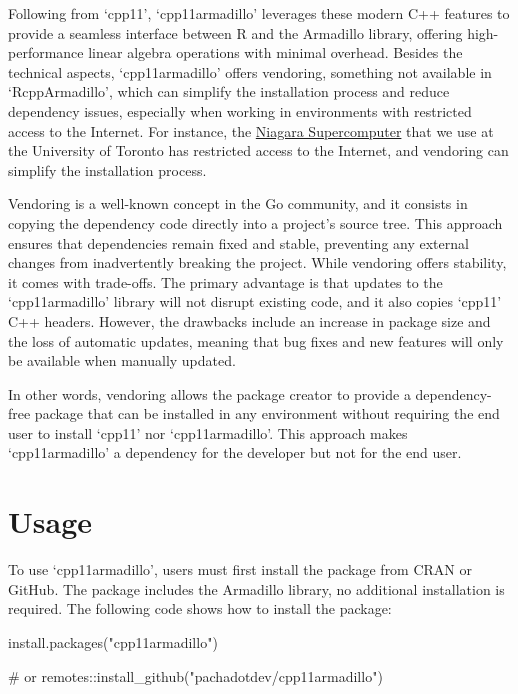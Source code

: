 \documentclass[
  10pt,
  letterpaper,
]{article}
\newenvironment{Shaded}{\begin{snugshade}}{\end{snugshade}}
\newcommand{\CommentTok}[1]{\textcolor[rgb]{0.37,0.37,0.37}{#1}}
\newcommand{\FunctionTok}[1]{\textcolor[rgb]{0.28,0.35,0.67}{#1}}
\newcommand{\NormalTok}[1]{\textcolor[rgb]{0.00,0.23,0.31}{#1}}
\newcommand{\SpecialCharTok}[1]{\textcolor[rgb]{0.37,0.37,0.37}{#1}}
\newcommand{\StringTok}[1]{\textcolor[rgb]{0.13,0.47,0.30}{#1}}
\begin{document}
Following from `cpp11', `cpp11armadillo' leverages these modern C++
features to provide a seamless interface between R and the Armadillo
library, offering high-performance linear algebra operations with
minimal overhead. Besides the technical aspects, `cpp11armadillo' offers
vendoring, something not available in `RcppArmadillo', which can
simplify the installation process and reduce dependency issues,
especially when working in environments with restricted access to the
Internet. For instance, the
\href{https://docs.scinet.utoronto.ca/index.php/Niagara_Quickstart}{Niagara
Supercomputer} that we use at the University of Toronto has restricted
access to the Internet, and vendoring can simplify the installation
process.

Vendoring is a well-known concept in the Go community, and it consists
in copying the dependency code directly into a project's source tree.
This approach ensures that dependencies remain fixed and stable,
preventing any external changes from inadvertently breaking the project.
While vendoring offers stability, it comes with trade-offs. The primary
advantage is that updates to the `cpp11armadillo' library will not
disrupt existing code, and it also copies `cpp11' C++ headers. However,
the drawbacks include an increase in package size and the loss of
automatic updates, meaning that bug fixes and new features will only be
available when manually updated.

In other words, vendoring allows the package creator to provide a
dependency-free package that can be installed in any environment without
requiring the end user to install `cpp11' nor `cpp11armadillo'. This
approach makes `cpp11armadillo' a dependency for the developer but not
for the end user.

\section{Usage}\label{usage}

To use `cpp11armadillo', users must first install the package from CRAN
or GitHub. The package includes the Armadillo library, no additional
installation is required. The following code shows how to install the
package:

\begin{Shaded}
\begin{Highlighting}[]
\FunctionTok{install.packages}\NormalTok{(}\StringTok{"cpp11armadillo"}\NormalTok{)}

\CommentTok{\# or}
\NormalTok{remotes}\SpecialCharTok{::}\FunctionTok{install\_github}\NormalTok{(}\StringTok{"pachadotdev/cpp11armadillo"}\NormalTok{)}
\end{Highlighting}
\end{Shaded}
\end{document}
